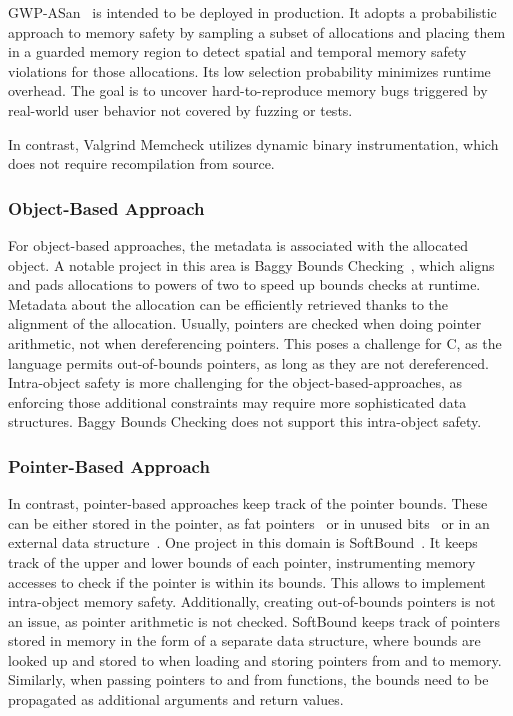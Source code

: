 GWP-ASan~\cite{serebryany2023gwp} is intended to be deployed in production.
It adopts a probabilistic approach to memory safety by sampling a subset of allocations and placing them in a guarded memory region to detect spatial and temporal memory safety violations for those allocations.
Its low selection probability minimizes runtime overhead.
The goal is to uncover hard-to-reproduce memory bugs triggered by real-world user behavior not covered by fuzzing or tests.

In contrast, Valgrind Memcheck utilizes dynamic binary instrumentation, which does not require recompilation from source.

\subsubsection{Object-Based Approach}

For object-based approaches, the metadata is associated with the allocated object.
A notable project in this area is Baggy Bounds Checking~\cite{akritidis2009baggy}, which aligns and pads allocations to powers of two to speed up bounds checks at runtime.
Metadata about the allocation can be efficiently retrieved thanks to the alignment of the allocation.
Usually, pointers are checked when doing pointer arithmetic, not when dereferencing pointers.
This poses a challenge for C, as the language permits out-of-bounds pointers, as long as they are not dereferenced.
Intra-object safety is more challenging for the object-based-approaches, as enforcing those additional constraints may require more sophisticated data structures.
Baggy Bounds Checking does not support this intra-object safety.

\subsubsection{Pointer-Based Approach}

In contrast, pointer-based approaches keep track of the pointer bounds.
These can be either stored in the pointer, as fat pointers~\cite{watson_cheri_2020} or in unused bits~\cite{serebryany2018memory} or in an external data structure~\cite{nagarakatte2009softbound}.
One project in this domain is SoftBound~\cite{nagarakatte2009softbound}.
It keeps track of the upper and lower bounds of each pointer, instrumenting memory accesses to check if the pointer is within its bounds.
This allows to implement intra-object memory safety.
Additionally, creating out-of-bounds pointers is not an issue, as pointer arithmetic is not checked.
SoftBound keeps track of pointers stored in memory in the form of a separate data structure, where bounds are looked up and stored to when loading and storing pointers from and to memory.
Similarly, when passing pointers to and from functions, the bounds need to be propagated as additional arguments and return values.

